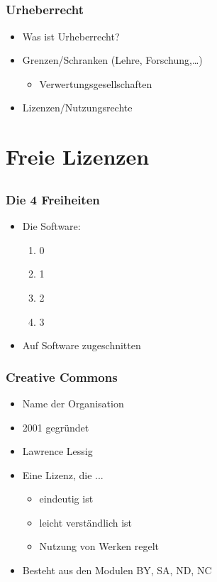 \documentclass{beamer}
\begin{document}
\subsection{}

\begin{frame}
    \frametitle{Urheberrecht}
    \begin{itemize}
        \item<2-> Was ist Urheberrecht?
        \item<3-> Grenzen/Schranken (Lehre, Forschung,\ldots)
        \begin{itemize}
          \item<4-> Verwertungsgesellschaften
        \end{itemize}
        \item<5-> Lizenzen/Nutzungsrechte
    \end{itemize}
\end{frame}

\section{Freie Lizenzen}
\subsection{}

\begin{frame}
    \frametitle{Die 4 Freiheiten}
    \begin{itemize}
        \item<2-> Die Software:
            \begin{enumerate}
            \setcounter{enumi}{0}
                \item<3-> 0
                \item<4-> 1
                \item<5-> 2
                \item<6-> 3
            \end{enumerate}
        \item<7-> Auf Software zugeschnitten
    \end{itemize}
\end{frame}

\begin{frame}
    \frametitle{Creative Commons}
    \begin{itemize}
        \item<2-> Name der Organisation
        \item<3-> 2001 gegründet
        \item<4-> Lawrence Lessig
        \item<5-> Eine Lizenz, die ...
        \begin{itemize}
          \item<6-> eindeutig ist
          \item<7-> leicht verständlich ist
          \item<8-> Nutzung von Werken regelt
        \end{itemize}
        \item<9-> Besteht aus den Modulen BY, SA, ND, NC
    \end{itemize}
\end{frame}
\end{document}

